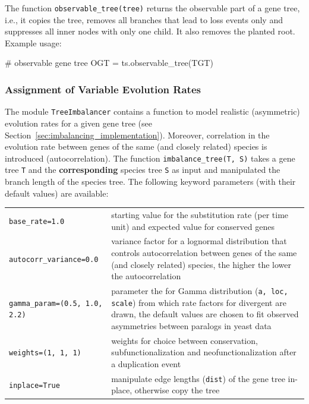 \documentclass[hidelinks,11pt]{article}
\begin{document}
The function \texttt{observable\_tree(tree)} returns the observable part of a gene tree, i.e., it copies the tree, removes all branches that lead to loss events only and suppresses all inner nodes with only one child. 
It also removes the planted root.
Example usage:
\vspace{2mm}
\begin{python}
# observable gene tree
OGT = ts.observable_tree(TGT)
\end{python}
\vspace{2mm}


\subsubsection{Assignment of Variable Evolution Rates}

The module \texttt{TreeImbalancer} contains a function to model realistic (asymmetric) evolution rates for a given gene tree (see Section~\ref{sec:imbalancing_implementation}).
Moreover, correlation in the evolution rate between genes of the same (and closely related) species is introduced (autocorrelation).
The function \texttt{imbalance\_tree(T, S)} takes a gene tree \texttt{T} and the \textbf{corresponding} species tree \texttt{S} as input and manipulated the branch length of the species tree.
The following keyword parameters (with their default values) are available:

\vspace{3mm}
\renewcommand{\arraystretch}{1.5}
\begin{tabularx}{0.95\textwidth} { >{\raggedright\arraybackslash}p{5.6cm} >{\raggedright\arraybackslash}X }
	\texttt{base\_rate=1.0} & starting value for the substitution rate (per time unit) and expected value for conserved genes\\
	\texttt{autocorr\_variance=0.0}  & variance factor for a lognormal distribution that controls autocorrelation between genes of the same (and closely related) species, the higher the lower the auto\-corre\-la\-tion\\
	\texttt{gamma\_param=(0.5, 1.0, 2.2)}  & parameter the for Gamma distribution (\texttt{a, loc, scale}) from which rate factors for divergent are drawn, the default values are chosen to fit observed asymmetries between paralogs in yeast data \citep{byrne2007}\\
	\texttt{weights=(1, 1, 1)}  & weights for choice between conservation,
	subfunctionalization and neofunctionalization after a duplication event\\
	\texttt{inplace=True}  & manipulate edge lengths (\texttt{dist}) of the gene tree in-place, otherwise copy the tree\\
\end{tabularx}
\vspace{3mm}
\end{document}
